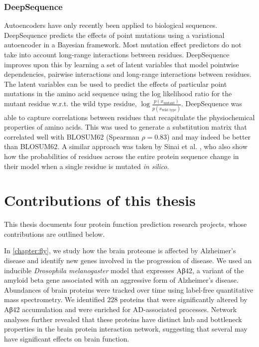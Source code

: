 \subsubsection{DeepSequence}
\label{sec:intro-deepsequence}

Autoencoders have only recently been applied to biological sequences. DeepSequence \cite{Riesselman2018} predicts the effects of point mutations using a variational autoencoder in a Bayesian framework. Most mutation effect predictors do not take into account long-range interactions between residues. DeepSequence improves upon this by learning a set of latent variables that model pointwise dependencies, pairwise interactions and long-range interactions between residues. The latent variables can be used to predict the effects of particular point mutations in the amino acid sequence using the log likelihood ratio for the mutant residue w.r.t. the wild type residue, $\log \frac{p(x_{\text{mutant}})}{p(x_{\text{wild type}})}$. DeepSequence was able to capture correlations between residues that recapitulate the physiochemical properties of amino acids. This was used to generate a substitution matrix that correlated well with BLOSUM62 (Spearman $\rho = 0.83$) and may indeed be better than BLOSUM62. A similar approach was taken by Sinai et al. \cite{Sinai2018}, who also show how the probabilities of residues across the entire protein sequence change in their model when a single residue is mutated \emph{in silico}.

\section{Contributions of this thesis}

This thesis documents four protein function prediction research projects, whose contributions are outlined below.

In \ref{chapter:fly}, we study how the brain proteome is affected by Alzheimer's disease and identify new genes involved in the progression of disease.
We used an inducible \textit{Drosophila melanogaster} model that expresses Aβ42, a variant of the amyloid beta gene associated with an aggressive form of Alzheimer's disease.
Abundances of brain proteins were tracked over time using label-free quantitative mass spectrometry.
We identified $228$ proteins that were significantly altered by Aβ42 accumulation and were enriched for AD-associated processes.
Network analyses further revealed that these proteins have distinct hub and bottleneck properties in the brain protein interaction network, suggesting that several may have significant effects on brain function.


